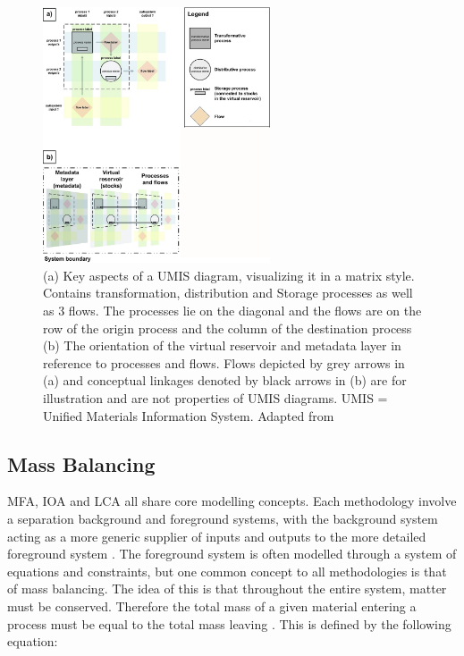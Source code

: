 \documentclass[ %
                    author={Tom Jager},
                supervisor={Dr. Daniel Schien},
                    degree={MEng},
                     title={A Bayesian Inference Engine for UMIS Structured Data},
                  subtitle={},
                      type={research},
                      year={2019} ]{dissertation}
\begin{document}
\begin{figure}[]
\centering
\includegraphics[width=0.6\textwidth]{images/umis_aspects.jpg}
\caption{(a) Key aspects of a UMIS diagram, visualizing it in a matrix style. Contains transformation, distribution and Storage processes as well as 3 flows. The processes lie on the diagonal and the flows are on the row of the origin process and the column of the destination process (b) The orientation of the virtual reservoir and metadata layer in reference to processes and flows. Flows depicted by grey arrows in (a) and conceptual linkages denoted by black arrows in (b) are for illustration and are not properties of UMIS diagrams. UMIS = Unified Materials Information System. Adapted from \cite{myers2019unified}}
\label{fig:umis_aspects}
\end{figure}

\subsection{Mass Balancing}
\label{sec:mass_balance}
MFA, IOA and LCA all share core modelling concepts. Each methodology involve a separation background and foreground systems, with the background system acting as a more generic supplier of inputs and outputs to the more detailed foreground system \cite{pauliuk2016prospective}. The foreground system is often modelled through a system of equations and constraints, but one common concept to all methodologies is that of mass balancing. The idea of this is that throughout the entire system, matter must be conserved. Therefore the total mass of a given material entering a process must be equal to the total mass leaving \cite{brunner2004practical}. This is defined by the following equation:
\end{document}
